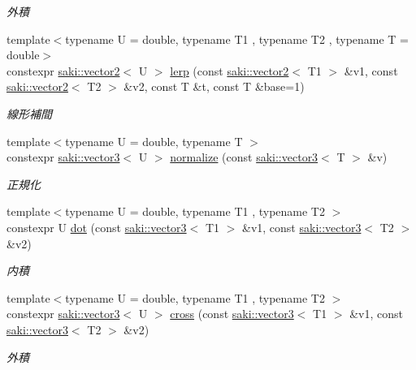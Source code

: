 \begin{DoxyCompactItemize}
\begin{DoxyCompactList}\small\item\em 外積 \end{DoxyCompactList}\item 
{\footnotesize template$<$typename U  = double, typename T1 , typename T2 , typename T  = double$>$ }\\constexpr \mbox{\hyperlink{classsaki_1_1vector2}{saki\+::vector2}}$<$ U $>$ \mbox{\hyperlink{namespacesaki_aca2e4449261f40ee6f47abc49844e66c}{lerp}} (const \mbox{\hyperlink{classsaki_1_1vector2}{saki\+::vector2}}$<$ T1 $>$ \&v1, const \mbox{\hyperlink{classsaki_1_1vector2}{saki\+::vector2}}$<$ T2 $>$ \&v2, const T \&t, const T \&base=1)
\begin{DoxyCompactList}\small\item\em 線形補間 \end{DoxyCompactList}\item 
{\footnotesize template$<$typename U  = double, typename T $>$ }\\constexpr \mbox{\hyperlink{classsaki_1_1vector3}{saki\+::vector3}}$<$ U $>$ \mbox{\hyperlink{namespacesaki_aa38ed490dc1e7d5df7241eefd1c9453b}{normalize}} (const \mbox{\hyperlink{classsaki_1_1vector3}{saki\+::vector3}}$<$ T $>$ \&v)
\begin{DoxyCompactList}\small\item\em 正規化 \end{DoxyCompactList}\item 
{\footnotesize template$<$typename U  = double, typename T1 , typename T2 $>$ }\\constexpr U \mbox{\hyperlink{namespacesaki_a5be905d72bf8dc80abc703fe69fa6fec}{dot}} (const \mbox{\hyperlink{classsaki_1_1vector3}{saki\+::vector3}}$<$ T1 $>$ \&v1, const \mbox{\hyperlink{classsaki_1_1vector3}{saki\+::vector3}}$<$ T2 $>$ \&v2)
\begin{DoxyCompactList}\small\item\em 内積 \end{DoxyCompactList}\item 
{\footnotesize template$<$typename U  = double, typename T1 , typename T2 $>$ }\\constexpr \mbox{\hyperlink{classsaki_1_1vector3}{saki\+::vector3}}$<$ U $>$ \mbox{\hyperlink{namespacesaki_a980242869d69e47ff8b10335e86ccf6f}{cross}} (const \mbox{\hyperlink{classsaki_1_1vector3}{saki\+::vector3}}$<$ T1 $>$ \&v1, const \mbox{\hyperlink{classsaki_1_1vector3}{saki\+::vector3}}$<$ T2 $>$ \&v2)
\begin{DoxyCompactList}\small\item\em 外積 \end{DoxyCompactList}\item 

\end{DoxyCompactItemize}

